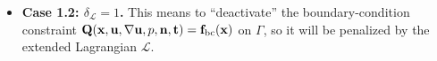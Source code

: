\documentclass[oneside,11pt]{book}
\numberwithin{equation}{section}
\newtheorem{question}{Question}[section]
\begin{document}
\begin{enumerate}[leftmargin=0mm]
\begin{itemize}[leftmargin=0in]
\begin{equation}
\begin{split}
                &\hspace{1cm}= -D_{\nabla{\bf u}}J_\Omega({\bf x},{\bf u},\nabla{\bf u},p){\bf n} - \nabla_{\bf u}J_\Gamma({\bf x},{\bf u},\nabla{\bf u},p,{\bf n},{\bf t}),\mbox{ on }\Gamma_{\rm v}^{\bf u},\\
                &{\bf v}\cdot{\bf n} = D_pJ_\Gamma({\bf x},{\bf u},\nabla{\bf u},p,{\bf n},{\bf t}),\mbox{ on }\Gamma_{\rm v}^p,\\
                &\nu{\bf n}\otimes{\bf v} = -\nabla_{\nabla{\bf u}}J_\Gamma({\bf x},{\bf u},\nabla{\bf u},p,{\bf n},{\bf t}),\mbox{ on }\Gamma.
            \end{split}\right.
        \end{equation}
    
        \begin{question}
            Is \eqref{adjoint general stationary Stokes/case 1.1} overdetermined or underdetermined? If yes, in which cases of the cost functional $J$?
        \end{question}
        \item \textbf{Case 1.2: $\delta_{\mathcal{L}} = 1$.} This means to ``deactivate'' the boundary-condition constraint ${\bf Q}({\bf x},{\bf u},\nabla{\bf u},p,{\bf n},{\bf t}) = {\bf f}_{\rm bc}({\bf x})$ on $\Gamma$, so it will be penalized by the extended Lagrangian $\mathcal{L}$.
        

\end{itemize}
\end{enumerate}
\end{document}
